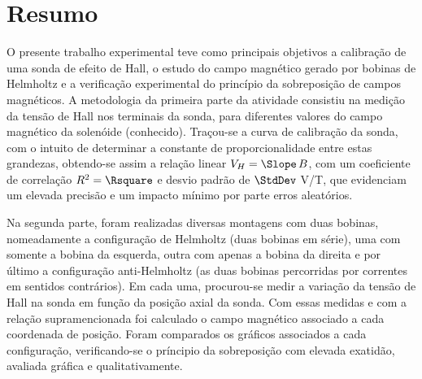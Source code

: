 \section{Resumo}
O presente trabalho experimental teve como principais objetivos a calibração de uma sonda de efeito de Hall, o estudo do campo magnético gerado por bobinas de Helmholtz e a verificação experimental do princípio da sobreposição de campos magnéticos.
A metodologia da primeira parte da atividade consistiu na medição da tensão de Hall nos terminais da sonda, para diferentes valores do campo magnético da solenóide (conhecido). Traçou-se a curva de calibração da sonda, com o intuito de determinar a constante de proporcionalidade entre estas grandezas, obtendo-se assim a relação linear $V_H =\Slope \,B$, com um  coeficiente de correlação $R^2 =\Rsquare$ e desvio padrão de $\StdDev$ V/T, que evidenciam um elevada precisão e um impacto mínimo por parte erros aleatórios. 

Na segunda parte, foram realizadas diversas montagens com duas bobinas, nomeadamente a configuração de Helmholtz (duas bobinas em série), uma com somente a bobina da esquerda, outra com apenas a bobina da direita e por último a configuração anti-Helmholtz (as duas bobinas percorridas por correntes em sentidos contrários). Em cada uma, procurou-se medir a variação da tensão de Hall na sonda em função da posição axial da sonda. Com essas medidas e com a relação supramencionada foi calculado o campo magnético associado a cada coordenada de posição. 
Foram comparados os gráficos associados a cada configuração, verificando-se o príncipio da sobreposição com elevada exatidão, avaliada gráfica e qualitativamente.





 
